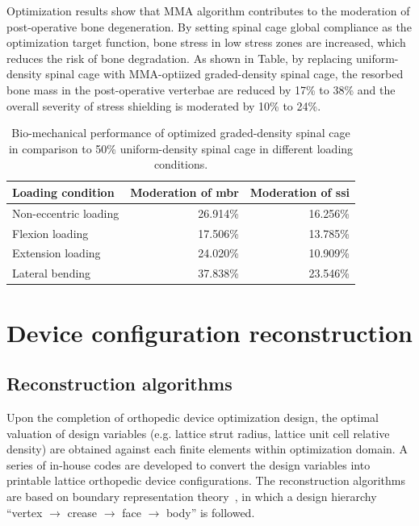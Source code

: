 \documentclass[12pt]{extbook}
\begin{document}
Optimization results show that MMA algorithm contributes to the moderation of post-operative bone degeneration. By setting spinal cage global compliance as the optimization target function, bone stress in low stress zones are increased, which reduces the risk of bone degradation. As shown in Table, by replacing uniform-density spinal cage with MMA-optiized graded-density spinal cage, the resorbed bone mass in the post-operative verterbae are reduced by 17\% to 38\% and the overall severity of stress shielding is moderated by 10\% to 24\%.\\

\begin{table}[htbp]
\centering
\caption{Bio-mechanical performance of optimized graded-density spinal cage in comparison to 50\% uniform-density spinal cage in different loading conditions.}
\begin{tabular}{lrr}
\hline\hline
Loading condition & Moderation of mbr & Moderation of ssi\\
\hline
Non-eccentric loading & 26.914\% & 16.256\%\\
Flexion loading & 17.506\% & 13.785\%\\
Extension loading & 24.020\% & 10.909\%\\
Lateral bending & 37.838\% & 23.546\%\\
\hline\hline
\end{tabular}
\label{cage_performance}
\end{table}






\chapter{Device configuration reconstruction}
\label{recon}

\section{Reconstruction algorithms}
\label{recon_algo}

Upon the completion of orthopedic device optimization design, the optimal valuation of design variables (e.g. lattice strut radius, lattice unit cell relative density) are obtained against each finite elements within optimization domain. A series of in-house codes are developed to convert the design variables into printable lattice orthopedic device configurations. The reconstruction algorithms are based on boundary representation theory~\cite{BABIC2008321}, in which a design hierarchy ``vertex $\to$ crease $\to$ face $\to$ body'' is followed.\\
\end{document}
